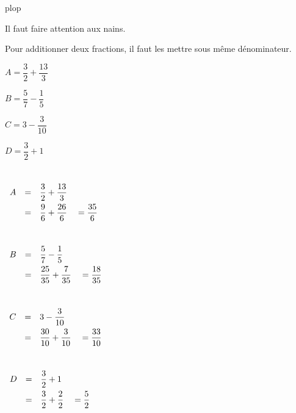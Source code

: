 \prop plop

\ex \lipsum[2]

\rem Il faut faire attention aux nains.

\methode

Pour additionner deux fractions, il faut les mettre sous même dénominateur.

\be
\item $A=\dfrac{3}{2}+\dfrac{13}{3}$
\item $B=\dfrac{5}{7}-\dfrac{1}{5}$
\ee
\ber
\item $C=3-\dfrac{3}{10}$
\item $D=\dfrac{3}{2}+1$
\ee
\emc

\correction{}

\be
\item ~\\
$\def\arraystretch{2}
	\begin{array}{rcl}
		A & = & \dfrac{3}{2}+\dfrac{13}{3}                       \\
		  & = & \dfrac{9}{6}+\dfrac{26}{6} \quad = \dfrac{35}{6}
	\end{array}$
\item ~\\
$\def\arraystretch{2}
	\begin{array}{rcl}
		B & = & \dfrac{5}{7}-\dfrac{1}{5}                             \\
		  & = & \dfrac{25}{35}+\dfrac{7}{35}  \quad =  \dfrac{18}{35}
	\end{array}$
\ee
\emc


\ber
\item ~\\
$\def\arraystretch{2}
	\begin{array}{rcl}
		C & = & 3-\dfrac{3}{10}                                     \\
		  & = & \dfrac{30}{10}+\dfrac{3}{10} \quad = \dfrac{33}{10}
	\end{array}$
\item ~\\
$\def\arraystretch{2}
	\begin{array}{rcl}
		D & = & \dfrac{3}{2}+1                                 \\
		  & = & \dfrac{3}{2}+\dfrac{2}{2} \quad = \dfrac{5}{2}
	\end{array}$
\ee
\emc

